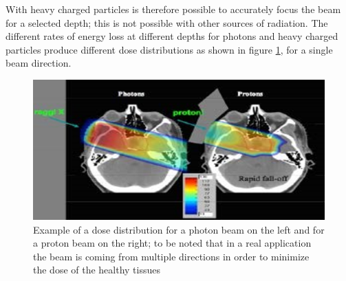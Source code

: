 \noindent With heavy charged particles is therefore possible to accurately focus the beam for a selected depth; this is not possible with other sources of radiation.
\newline
The different rates of energy loss at different depths for photons and heavy charged particles produce different dose distributions as shown in figure \ref{fig:Dose}, for a single beam direction.
\begin{figure}[H]
	\centering
	\includegraphics[width=0.7\linewidth]{IMG/ch1/Dose}
	\caption{Example of a dose distribution for a photon beam on the left and for a proton beam on the right; to be noted that in a real application the beam is coming from multiple directions in order to minimize the dose of the healthy tissues}
	\label{fig:Dose}
\end{figure}

